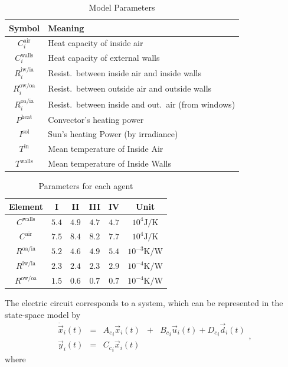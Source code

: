 \documentclass[../main.tex]{subfiles}
\begin{document}
\begin{table}[h]
  \centering
  \caption{Model Parameters}\label{tab:modelParamMeaning}
  \begin{tabular}[b]{cl}
    \toprule
    Symbol&Meaning\\
    \midrule
    $C^{\text{air}}_{i}$  &Heat capacity of inside air\\
    $C^{\text{walls}}_{i}$ &Heat capacity of external walls\\
    $R^{\text{iw/ia}}_{i}$ &Resist.\ between inside air and inside walls\\
    $R^{\text{ow/oa}}_{i}$ &Resist.\ between outside air and outside walls\\
    $R^{\text{oa/ia}}_{i}$ &Resist.\ between inside and out.\ air (from windows)\\
    $P^{\text{heat}}$ &Convector's heating power\\
    $I^{\text{sol}}$ &Sun's heating Power (by irradiance)\\
    $T^{\text{in}}$ &Mean temperature of Inside Air\\
    $T^{\text{walls}}$ &Mean temperature of Inside Walls\\
    \bottomrule
  \end{tabular}
\end{table}

\begin{table}[h]
  \centering
  \caption{
    Parameters for each agent}\label{tab:modelParam}
  \begin{tabular}[t]{cccccc} \toprule
    Element& I & II & III & IV &Unit\\
    \midrule
    $C^{\text{walls}}$   &$5.4$&$4.9$&$4.7$&$4.7$ &$10^{4}\mathrm{J/K}$ \\
    $C^{\text{air}}$     &$7.5$ &$8.4 $&$8.2$ &$7.7$&$10^{4}\mathrm{J/K}$  \\
    $R^{\text{oa/ia}}$   &$5.2$&$4.6$&$4.9$&$5.4$&$10^{-3}\mathrm{K/W}$ \\
    $R^{\text{iw/ia}}$   &$2.3$&$2.4$&$2.3$&$2.9$&$10^{-4}\mathrm{K/W}$\\
    $R^{\text{ow/oa}}$   &$1.5$&$0.6$&$0.7$&$0.7$& $10^{-4}\mathrm{K/W}$ \\
    \bottomrule
  \end{tabular}
\end{table}


The electric circuit corresponds to a \ltict{} system, which can be represented in the state-space model by
  \begin{equation}
  \begin{matrix}
    \label{eq:systems_cont}
    \dot{\vec{x}}_{i}(t)  &=&{A_{c}}_{i}\vec{x}_{i}(t) &+& {B_{c}}_{i}\vec{u}_{i}(t)+{D_{c}}_{i}\vec{d}_{i}(t)\\
    \vec{y}_{i}(t)        &=&{C_{c}}_{i}\vec{x}_{i}(t) &&
  \end{matrix},
\end{equation}
where
\end{document}
